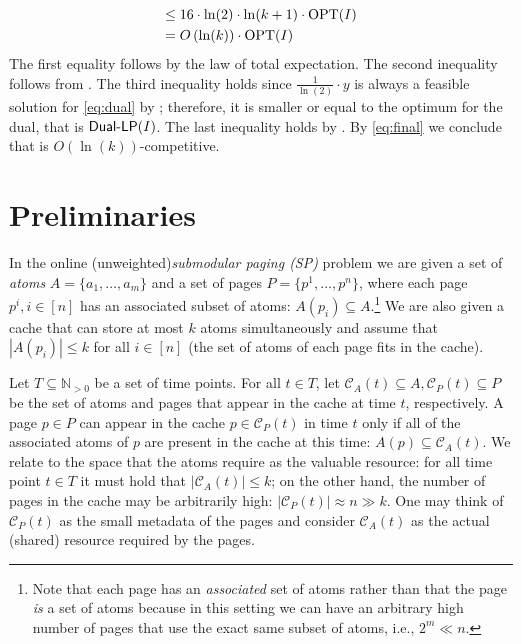 \documentclass[11pt]{article}
\newcommand{\cC}{{\mathcal{C}}}
\newcommand{\OPT}{\textnormal{OPT}}
\begin{document}
{\begin{equation}
\begin{aligned}
		\leq{} & 16 \cdot \ln (2) \cdot \ln (k+1) \cdot \OPT(I)\\
		={} & O \left( \ln (k)\right) \cdot \OPT(I)
	\end{aligned}
\end{equation} The first equality follows by the law of total expectation. The second inequality follows from . The third inequality holds since $\frac{1}{\ln(2)} \cdot y$ is always a feasible solution for \eqref{eq:dual} by ; therefore, it is smaller or equal to the optimum for the dual, that is $\textnormal{\textsf{Dual-LP}}(I)$. The last inequality holds by . By \eqref{eq:final} we conclude that  is $O \left( \ln (k)\right)$-competitive. 





\section{Preliminaries}





 In the online (unweighted){\em submodular paging (SP)} problem we are given a set of {\em atoms} $A = \{a_1,\ldots,a_m\}$ and a set of pages $P = \{p^1,\ldots,p^n\}$, where each page $p^i, i \in [n]$ has an associated subset of atoms: $A(p_i) \subseteq A$.\footnote{Note that each page has an {\em associated} set of atoms rather than that the page {\em is} a set of atoms because in this setting we can have an arbitrary high number of pages that use the exact same subset of atoms, i.e., $2^m \ll n$.} We are also given a cache that can store at most $k$ atoms simultaneously and assume that $|A(p_i)| \leq k$ for all $i \in [n]$ (the set of atoms of each page fits in the cache). 

Let $T \subseteq \mathbb{N}_{>0}$ be a set of time points. For all $t \in T$, let $\cC_A(t) \subseteq A,\cC_P(t) \subseteq P$ be the set of atoms and pages that appear in the cache at time $t$, respectively.  A page $p \in P$ can appear in the cache $p \in \cC_P(t)$ in time $t$ only if all of the associated atoms of $p$ are present in the cache at this time: $A(p) \subseteq \cC_A(t)$. We relate to the space that the atoms require as the valuable resource: for all time point $t \in T$ it must hold that $|\cC_A(t)| \leq k$; on the other hand, the number  of pages in the cache may be arbitrarily high: $|\cC_P(t)| \approx n \gg k$. One may think of $\cC_P(t)$ as the small metadata of the pages and consider $\cC_A(t)$ as the actual (shared) resource required by the pages. 

}
\end{document}
